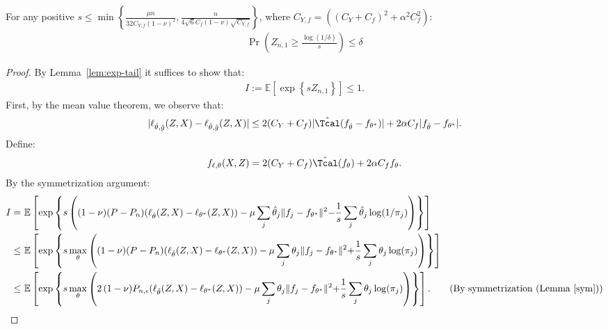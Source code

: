 \documentclass[12pt]{extarticle} %
\newcommand{\E}{\mathbb{E}}
\begin{document}
\begin{lemma}\label{lem:z1}
For any positive $s\leq \min\left\{ \frac{\mu n}{32C_{Y,f}(1-\nu)^2}, \frac{n}{4\sqrt{6} C_f (1-\nu) \sqrt{C_{Y,f}}}\right\}$, where $C_{Y,f} = ((C_Y+C_f)^2+\alpha^2 C_f^2)$:
\begin{align}
    {\Pr\left(Z_{n,1} \geq \frac{\log(1/\delta)}{s}\right) \leq \delta}
\end{align}
\end{lemma}
\begin{proof}
By Lemma~\ref{lem:exp-tail} it suffices to show that:
\begin{align*}
    {I:=\E\left[\exp\left\{s Z_{n,1}\right\}\right] \leq 1}.
\end{align*}
First, by the mean value theorem, we observe that:
\begin{align*}
    |\ell_{\hat{\theta},\hat{g}}(Z,X) - \ell_{\hat{\theta},\hat{g}}(Z,X)|\leq 2(C_Y+C_f)|\hat{\Tcal}(f_{\hat{\theta}}-f_{\theta^*})| + 2\alpha C_f|f_{\hat{\theta}}-f_{\theta^*}|.
\end{align*}
Define:
\begin{align*}
    f_{\ell,\theta}(X,Z) = 2(C_Y+C_f)\hat{\Tcal}(f_{\theta}) + 2\alpha C_f f_{\theta}.
\end{align*}
By the symmetrization argument:
\begin{align*}
    I =~& \E\left[\exp\left\{s \left((1-\nu)(P-P_n)(\ell_{\hat{\theta}}(Z,X) - \ell_{\theta^*}(Z,X)) - \mu \sum_j \hat{\theta}_j \|f_j - f_{\theta^*}\|^2 {-\frac{1}{s}\sum_j\hat{\theta}_j \log(1/\pi_j)}\right)\right\}\right]\\
    \leq~& \E\left[\exp\left\{s \max_{\theta} \left((1-\nu)(P-P_n)(\ell_{\hat{\theta}}(Z,X) - \ell_{\theta^*}(Z,X)) - \mu \sum_j \theta_j \|f_j - f_{\theta^*}\|^2 {+\frac{1}{s}\sum_j\theta_j \log(\pi_j)} \right)\right\}\right]\\
    \leq~& \E\left[\exp\left\{s \max_{\theta} \left(2\,(1-\nu)P_{n,\epsilon}(\ell_{\hat{\theta}}(Z,X) - \ell_{\theta^*}(Z,X)) - \mu \sum_j \theta_j \|f_j - f_{\theta^*}\|^2 {+\frac{1}{s}\sum_j\theta_j\log(\pi_j)}\right)\right\}\right].\tag{By symmetrization (Lemma \ref{sym})}

\end{align*}
\end{proof}
\end{document}

